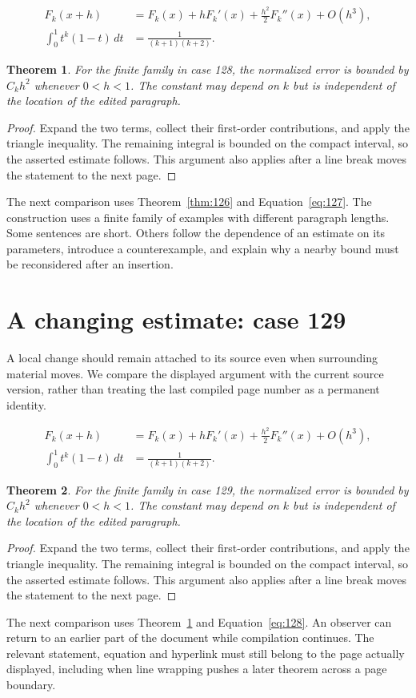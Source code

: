 \documentclass[a4paper,10pt]{article}
\newtheorem{theorem}{Theorem}[section]
\begin{document}
\lipsum[22-23]
\begin{align}\label{eq:127}
 F_k(x+h)&=F_k(x)+hF_k'(x)+\frac{h^2}{2}F_k''(x)+O(h^3),\\
 \int_0^1 t^k(1-t)\,dt&=\frac{1}{(k+1)(k+2)}.
\end{align}
\begin{theorem}\label{thm:127}
For the finite family in case 128, the normalized error is bounded by $C_k h^2$ whenever $0<h<1$. The constant may depend on $k$ but is independent of the location of the edited paragraph.
\end{theorem}
\begin{proof}
Expand the two terms, collect their first-order contributions, and apply the
triangle inequality. The remaining integral is bounded on the compact interval,
so the asserted estimate follows. This argument also applies after a line break
moves the statement to the next page.
\end{proof}
The next comparison uses Theorem~\ref{thm:126} and Equation~\ref{eq:127}. The construction uses a finite family of examples with different paragraph lengths. Some sentences are short. Others follow the dependence of an estimate on its parameters, introduce a counterexample, and explain why a nearby bound must be reconsidered after an insertion.

\lipsum[13]

\section{A changing estimate: case 129}\label{unit:128}
A local change should remain attached to its source even when surrounding material moves. We compare the displayed argument with the current source version, rather than treating the last compiled page number as a permanent identity.

\lipsum[25-26]
\begin{align}\label{eq:128}
 F_k(x+h)&=F_k(x)+hF_k'(x)+\frac{h^2}{2}F_k''(x)+O(h^3),\\
 \int_0^1 t^k(1-t)\,dt&=\frac{1}{(k+1)(k+2)}.
\end{align}
\begin{theorem}\label{thm:128}
For the finite family in case 129, the normalized error is bounded by $C_k h^2$ whenever $0<h<1$. The constant may depend on $k$ but is independent of the location of the edited paragraph.
\end{theorem}
\begin{proof}
Expand the two terms, collect their first-order contributions, and apply the
triangle inequality. The remaining integral is bounded on the compact interval,
so the asserted estimate follows. This argument also applies after a line break
moves the statement to the next page.
\end{proof}
The next comparison uses Theorem~\ref{thm:127} and Equation~\ref{eq:128}. An observer can return to an earlier part of the document while compilation continues. The relevant statement, equation and hyperlink must still belong to the page actually displayed, including when line wrapping pushes a later theorem across a page boundary.
\end{document}
